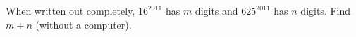 When written out completely, $16^{2011}$ has $m$ digits and $625^{2011}$ has $n$ digits. Find $m+n$ (without a computer).
